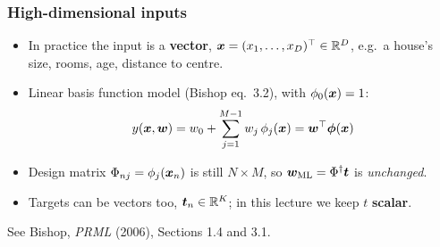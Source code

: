\documentclass[10pt]{beamer}
\begin{document}
\begin{frame}[fragile]
\frametitle{High-dimensional inputs}

\begin{itemize}
\item In practice the input is a \textbf{vector}, $\boldsymbol{x} =
  (x_1,\dots,x_D)^\top \in \mathbb{R}^D$, e.g.\ a house's size, rooms,
  age, distance to centre.
\item Linear basis function model (Bishop eq.\ 3.2), with
  $\phi_0(\boldsymbol{x}) = 1$:
\[
y(\boldsymbol{x},\boldsymbol{w}) = w_0 + \sum_{j=1}^{M-1} w_j\,\phi_j(\boldsymbol{x})
= \boldsymbol{w}^\top\boldsymbol\phi(\boldsymbol{x})
\]
\item Design matrix $\Phi_{nj} = \phi_j(\boldsymbol{x}_n)$ is still $N\times M$,
  so $\boldsymbol{w}_{\mathrm{ML}} = \Phi^\dagger\boldsymbol{t}$ is \emph{unchanged}.
\item Targets can be vectors too, $\boldsymbol{t}_n\in\mathbb{R}^K$; in this
  lecture we keep $t$ \textbf{scalar}.
\end{itemize}


\vspace{2pt}
{\scriptsize See Bishop, \emph{PRML} (2006), Sections 1.4 and 3.1.}

\end{frame}
\end{document}
